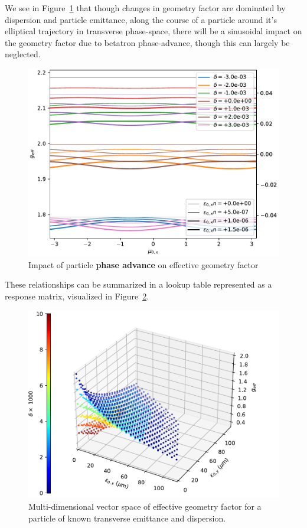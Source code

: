 We see in Figure~\ref{fig:g_phase_advance} that though changes in geometry factor are dominated by dispersion and particle emittance, along the course of a particle around it's elliptical trajectory in transverse phase-space, there will be a sinusoidal impact on the geometry factor due to betatron phase-advance, though this can largely be neglected.

\begin{figure}
    \centering
    \includegraphics{figs/g_phase_advance.pdf}
    \caption{Impact of particle \textbf{phase advance} on effective geometry factor}
    \label{fig:g_phase_advance}
\end{figure}

These relationships can be summarized in a lookup table represented as a response matrix, visualized in Figure~\ref{fig:g_eff_vol}.

\begin{figure}
    \centering
    \includegraphics{figs/g_eff.surface.0.pdf}
    \caption{Multi-dimensional vector space of effective geometry factor for a particle of known transverse emittance and dispersion.}
    \label{fig:g_eff_vol}
\end{figure}

